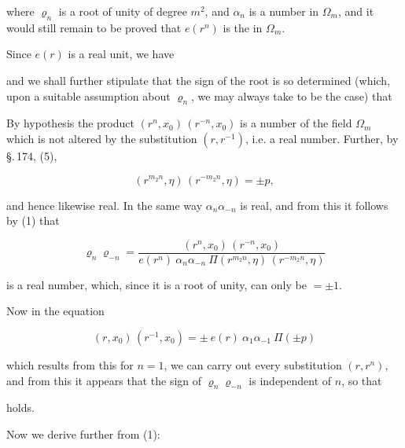 where $\varrho_n$ is a root of unity of degree $m^2$, and $\alpha_n$ is a
number in $\Omega_m$, and it would still remain to be proved that
$e(r^n)$ is the  in $\Omega_m$.

Since $e(r)$ is a real unit, we have


and we shall further stipulate that the sign of the root is so
determined (which, upon a suitable assumption about $\varrho_n$, we
may always take to be the case) that


By hypothesis the product $(r^n, x_0)\,(r^{-n}, x_0)$ is a number of
the field $\Omega_m$ which is not altered by the substitution
$(r, r^{-1})$, i.e. a real number. Further, by \S.\,174, (5),

\[
(r^{m_2 n}, \eta)\,(r^{-m_2 n}, \eta) = \pm p,
\]

and hence likewise real. In the same way $\alpha_n \alpha_{-n}$ is
real, and from this it follows by (1) that

\[
\varrho_n \varrho_{-n} = \frac{(r^n, x_0)\,(r^{-n}, x_0)}
{e(r^n)\ \alpha_n \alpha_{-n}\ \Pi(r^{m_2 n}, \eta)\,(r^{-m_2 n}, \eta)}
\]

is a real number, which, since it is a root of unity, can only be
$= \pm 1$.

Now in the equation

\[
(r, x_0)\,(r^{-1}, x_0) = \pm\ e(r)\ \alpha_1 \alpha_{-1}\ \Pi(\pm p)
\]

which results from this for $n = 1$, we can carry out every
substitution $(r, r^n)$, and from this it appears that the sign of
$\varrho_n \varrho_{-n}$ is independent of $n$, so that


holds.

Now we derive further from (1):


